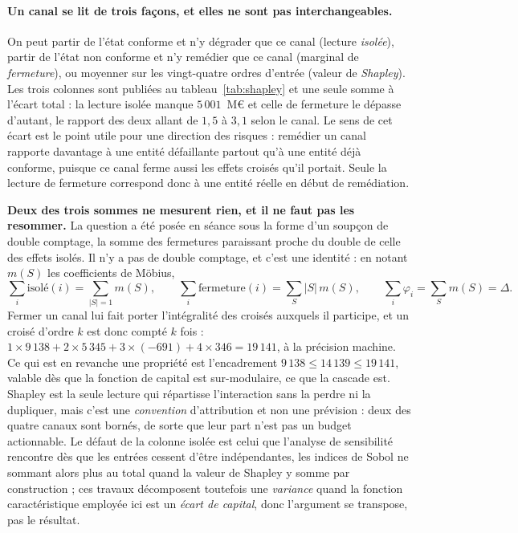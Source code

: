 \paragraph{Un canal se lit de trois façons, et elles ne sont pas interchangeables.} On peut partir
de l'état conforme et n'y dégrader que ce canal (lecture \emph{isolée}), partir de l'état non
conforme et n'y remédier que ce canal (marginal de \emph{fermeture}), ou moyenner sur les
vingt-quatre ordres d'entrée (valeur de \emph{Shapley}). Les trois colonnes sont publiées au
tableau~\ref{tab:shapley} et une seule somme à l'écart total : la lecture isolée manque
$5\,001$~M\euro{} et celle de fermeture le dépasse d'autant, le rapport des deux allant de
$1{,}5$ à $3{,}1$ selon le canal. Le sens de cet écart est le point utile pour une direction des
risques : remédier un canal rapporte davantage à une entité défaillante partout qu'à une entité
déjà conforme, puisque ce canal ferme aussi les effets croisés qu'il portait. Seule la lecture de
fermeture correspond donc à une entité réelle en début de remédiation.

\begin{attention}
\textbf{Deux des trois sommes ne mesurent rien, et il ne faut pas les resommer.} La question a été
posée en séance sous la forme d'un soupçon de double comptage, la somme des fermetures paraissant
proche du double de celle des effets isolés. Il n'y a pas de double comptage, et c'est une
identité : en notant $m(S)$ les coefficients de Möbius,
\[
  \sum_i \text{isolé}(i) = \!\!\sum_{|S|=1}\!\! m(S), \qquad
  \sum_i \text{fermeture}(i) = \sum_S |S|\,m(S), \qquad
  \sum_i \varphi_i = \sum_S m(S) = \Delta .
\]
Fermer un canal lui fait porter l'intégralité des croisés auxquels il participe, et un croisé
d'ordre $k$ est donc compté $k$ fois :
$1\times 9\,138 + 2\times 5\,345 + 3\times(-691) + 4\times 346 = 19\,141$, à la précision machine.
Ce qui est en revanche une propriété est l'encadrement $9\,138 \leq 14\,139 \leq 19\,141$, valable
dès que la fonction de capital est sur-modulaire, ce que la cascade est. Shapley est la seule
lecture qui répartisse l'interaction sans la perdre ni la dupliquer, mais c'est une
\emph{convention} d'attribution et non une prévision : deux des quatre canaux sont bornés, de
sorte que leur part n'est pas un budget actionnable. Le défaut de la colonne isolée est celui que
l'analyse de sensibilité rencontre dès que les entrées cessent d'être indépendantes, les indices
de Sobol ne sommant alors plus au total quand la valeur de Shapley y somme par construction
\citep{Owen2014, IoossPrieur2019} ; ces travaux décomposent toutefois une \emph{variance} quand la
fonction caractéristique employée ici est un \emph{écart de capital}, donc l'argument se transpose,
pas le résultat.
\end{attention}

